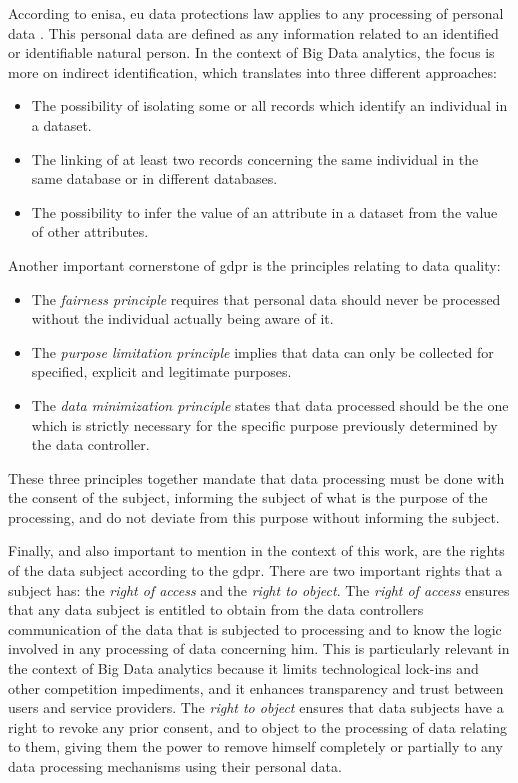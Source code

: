  According to \ac{enisa}, \ac{eu} data protections law applies to any processing of personal data \cite{DAcquisto2015}. This personal data are defined as any information related to an identified or identifiable natural person. In the context of Big Data analytics, the focus is more on indirect identification, which translates into three different approaches:

\begin{itemize}
	\item The possibility of isolating some or all records which identify an individual in a dataset.
	\item The linking of at least two records concerning the same individual in the same database or in different databases.
	\item The possibility to infer the value of an attribute in a dataset from the value of other attributes.
\end{itemize}


Another important cornerstone of \ac{gdpr} is the principles relating to data quality:

\begin{itemize}

    \item The \textit{fairness principle} requires that personal data should never be processed without the individual actually being aware of it.

    \item The \textit{purpose limitation principle} implies that data can only be collected for specified, explicit and legitimate purposes.

    \item The \textit{data minimization principle} states that data processed should be the one which is strictly necessary for the specific purpose previously determined by the data controller.
\end{itemize}


These three principles together mandate that data processing must be done with the consent of the subject, informing the subject of what is the purpose of the processing, and do not deviate from this purpose without informing the subject.

Finally, and also important to mention in the context of this work, are the rights of the data subject according to the \ac{gdpr}. There are two important rights that a subject has: the \textit{right of access} and the \textit{right to object}.
The \textit{right of access} ensures that any data subject is entitled to obtain from the data controllers communication of the data that is subjected to processing and to know the logic involved in any processing of data concerning him.
This is particularly relevant in the context of Big Data analytics because it limits technological lock-ins and other competition impediments, and it enhances transparency and trust between users and service providers.
The \textit{right to object} ensures that data subjects have a right to revoke any prior consent, and to object to the processing of data relating to them, giving them the power to remove himself completely or partially to any data processing mechanisms using their personal data.


